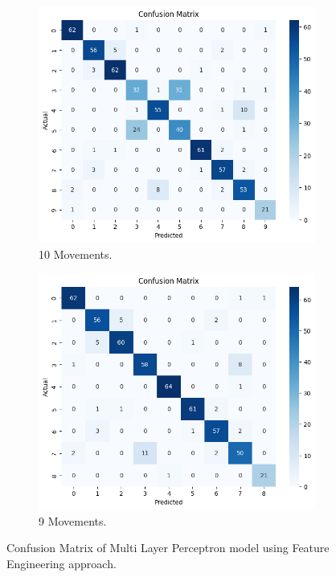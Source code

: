             \begin{figure}[h]
                \begin{subfigure}{.5\textwidth}
                \centering
                  \includegraphics[width=1.\linewidth]{../src/resources/plots/conf-matrix/fe.png}
                  \caption{10 Movements.}
                  \label{fig:cm_all}
                \end{subfigure}%
                \begin{subfigure}{.5\textwidth}
                \centering
                  \includegraphics[width=1.\linewidth]{../src/resources/plots/conf-matrix/fe-remove.png}
                  \caption{9 Movements.}
                  \label{fig:cm_remove}
                \end{subfigure}
                \caption{Confusion Matrix of Multi Layer Perceptron model using Feature Engineering approach.}
            \end{figure}
            

